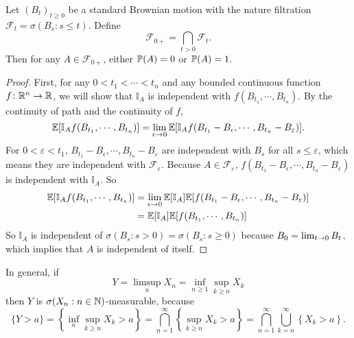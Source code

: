 \begin{thm}[0-1 Law]
    Let $(B_t)_{t \geq 0}$ be a standard Brownian motion with the nature filtration $\mathcal{F}_t = \sigma(B_s: s \leq t)$. Define
    \begin{equation*}
        \mathcal{F}_{0+}= \bigcap_{t > 0} \mathcal{F}_t.
    \end{equation*}
    Then for any $A \in \mathcal{F}_{0+}$, either $\mathbb{P}(A) = 0$ or $\mathbb{P}(A) = 1$.
\end{thm}
\begin{proof}
    First, for any $0 < t_1 < \cdots < t_n$ and any bounded continuous function $f \colon \mathbb{R}^n \rightarrow \mathbb{R}$, we will show that $\mathbb{I}_A$ is independent with $f(B_{t_1},\cdots,B_{t_n})$. By the continuity of path and the continuity of $f$,
    \begin{equation*}
        \mathbb{E}[\mathbb{I}_Af(B_{t_1},\cdots,B_{t_n})] = \lim_{\epsilon \rightarrow 0 }\mathbb{E}[\mathbb{I}_Af(B_{t_1}-B_{\epsilon},\cdots,B_{t_n}-B_{\varepsilon})].
    \end{equation*}
    For $0 < \varepsilon < t_1$, $B_{t_1}-B_{\epsilon},\cdots,B_{t_n}-B_{\varepsilon}$ are independent with $B_s$ for all $s \leq \varepsilon$, which means they are independent with $\mathcal{F}_\varepsilon$. Because $A \in \mathcal{F}_\varepsilon$, $f(B_{t_1}-B_{\epsilon},\cdots,B_{t_n}-B_{\varepsilon})$ is independent with $\mathbb{I}_A$. So
    \begin{equation*}
        \begin{aligned}
            \mathbb{E}[\mathbb{I}_Af(B_{t_1},\cdots,B_{t_n})] &= \lim_{\epsilon \rightarrow 0 } \mathbb{E}[\mathbb{I}_A]\mathbb{E}[f(B_{t_1}-B_{\epsilon},\cdots,B_{t_n}-B_{\varepsilon})]\\
            &=  \mathbb{E}[\mathbb{I}_A]\mathbb{E}[f(B_{t_1},\cdots,B_{t_n})]
        \end{aligned}
    \end{equation*}
    So $\mathbb{I}_A$ is independent of $\sigma(B_s: s > 0) = \sigma(B_s : s \geq 0)$ because $B_0 = \lim_{t \rightarrow 0} B_t$, which implies that $A$ is independent of itself.
\end{proof}
\begin{rmk}
    In general, if
    \begin{equation*}
        Y = \limsup_n X_{n} = \inf _{n \geq 1} \sup _{k \geq n} X_k
    \end{equation*}
    then $Y$ is $\sigma(X_n: n\in \mathbb{N})$-measurable, because
    \begin{equation*}
        \{Y>a\}=\left\{\inf _n \sup _{k \geq n} X_k>a\right\}=\bigcap_{n=1}^{\infty}\left\{\sup _{k \geq n} X_k>a\right\}=\bigcap_{n=1}^{\infty} \bigcup_{k=n}^{\infty}\left\{X_k>a\right\} .
    \end{equation*}
\end{rmk}

